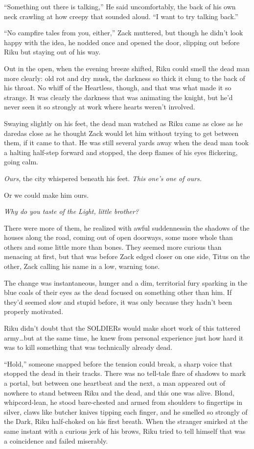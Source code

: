 ``Something out there is talking,'' He said uncomfortably, the back of his own neck crawling at how creepy that sounded aloud. ``I want to try talking back.''

``No campfire tales from you, either,'' Zack muttered, but though he didn't look happy with the idea, he nodded once and opened the door, slipping out before Riku but staying out of his way.

Out in the open, when the evening breeze shifted, Riku could smell the dead man more clearly: old rot and dry musk, the darkness so thick it clung to the back of his throat. No whiff of the Heartless, though, and that was what made it so strange. It was clearly the darkness that was animating the knight, but he'd never seen it so strongly at work where hearts weren't involved.

Swaying slightly on his feet, the dead man watched as Riku came as close as he dared\textemdash as close as he thought Zack would let him without trying to get between them, if it came to that. He was still several yards away when the dead man took a halting half-step forward and stopped, the deep flames of his eyes flickering, going calm.

\emph{Ours,} the city whispered beneath his feet. \emph{This one's one of ours.}

\textemdash Or we could make him ours.

\emph{Why do you taste of the Light, little brother?}

There were more of them, he realized with awful suddenness\textemdash in the shadows of the houses along the road, coming out of open doorways, some more whole than others and some little more than bones. They seemed more curious than menacing at first, but that was before Zack edged closer on one side, Titus on the other, Zack calling his name in a low, warning tone.

The change was instantaneous, hunger and a dim, territorial fury sparking in the blue coals of their eyes as the dead focused on something other than him. If they'd seemed slow and stupid before, it was only because they hadn't been properly motivated.

Riku didn't doubt that the SOLDIERs would make short work of this tattered army\ldots but at the same time, he knew from personal experience just how hard it was to kill something that was technically already dead.

``Hold,'' someone snapped before the tension could break, a sharp voice that stopped the dead in their tracks. There was no tell-tale flare of shadows to mark a portal, but between one heartbeat and the next, a man appeared out of nowhere to stand between Riku and the dead, and this one was alive. Blond, whipcord-lean, he stood bare-chested and armed from shoulders to fingertips in silver, claws like butcher knives tipping each finger, and he smelled so strongly of the Dark, Riku half-choked on his first breath. When the stranger smirked at the same instant with a curious jerk of his brows, Riku tried to tell himself that was a coincidence and failed miserably.

